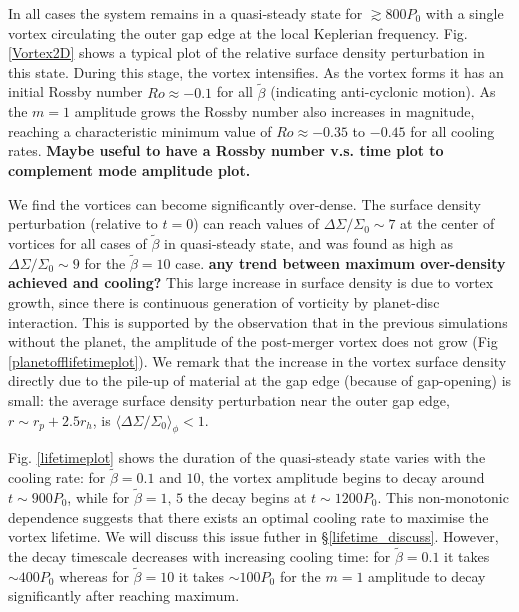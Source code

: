 In all cases the system remains in a quasi-steady state for
$\gtrsim800P_0$ with a single vortex circulating 
the outer gap edge at the local Keplerian  
frequency. Fig. \ref{Vortex2D} shows a typical plot of the relative 
surface density perturbation in this state. During this stage, the 
vortex intensifies. As the vortex forms it has an initial 
Rossby number $Ro\approx-0.1$ for all $\tilde\beta$
(indicating anti-cyclonic 
motion). As the $m=1$ amplitude grows the Rossby number also increases
in magnitude, 
 reaching a characteristic minimum value of $Ro\approx-0.35$ to $-0.45$ for
all cooling rates. 
{\bf Maybe useful to have a Rossby number v.s. time plot to complement
  mode amplitude plot. 
}

We find the vortices can become significantly over-dense. 
The surface density perturbation (relative to $t=0$)  
can reach values of $\Delta\Sigma/\Sigma_0 \sim 7$ at the center of vortices
for all cases of $\tilde\beta$ in quasi-steady state, and
was found as high as $\Delta\Sigma/\Sigma_0 \sim 9$ for the 
$\tilde\beta=10$ case. {\bf any trend between maximum over-density
  achieved and cooling?}
This large increase in surface density is due to  
vortex growth, since there is continuous generation of vorticity by
planet-disc interaction. This is supported by the observation that in
the previous simulations without the planet, the amplitude of
the post-merger vortex does not grow (Fig
\ref{planetofflifetimeplot}).  We remark that the increase in the
vortex surface density directly due to the pile-up of material at the
gap edge (because of gap-opening) is small: the average surface density
perturbation near the outer gap edge, $r\sim r_{p}+2.5r_h$, is 
$\langle\Delta\Sigma/\Sigma_0\rangle_\phi<1$.  

Fig. \ref{lifetimeplot} shows the duration of the quasi-steady state
varies with the cooling rate: for
$\tilde{\beta}=0.1$ and $10$, the vortex amplitude begins to decay around
$t\sim900P_0$, while for $\tilde{\beta}=1,\,5$ the decay begins at 
$t\sim1200P_0$. This non-monotonic dependence suggests that there
exists an optimal cooling rate to maximise the vortex lifetime. We
will discuss this issue futher in
\S\ref{lifetime_discuss}. However, the decay timescale decreases with
increasing cooling time: for $\tilde{\beta}=0.1$ it takes $\sim400P_0$
whereas for $\tilde{\beta}=10$ it takes $\sim 100P_0$ for the $m=1$
amplitude to decay significantly after reaching maximum. 

